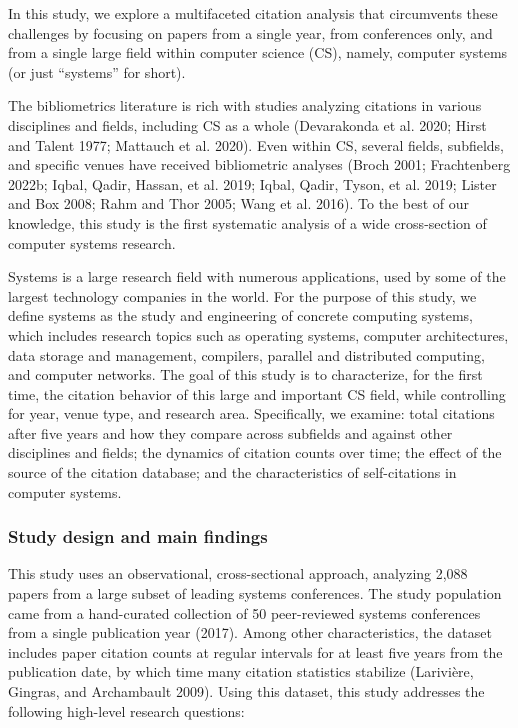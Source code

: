 \documentclass{article}
\begin{document}
In this study, we explore a multifaceted citation analysis that circumvents these challenges by focusing on papers from a single year, from conferences only, and from a single large field within computer science (CS), namely, computer systems (or just ``systems'' for short).

The bibliometrics literature is rich with studies analyzing citations in various disciplines and fields, including CS as a whole (Devarakonda et al. 2020; Hirst and Talent 1977; Mattauch et al. 2020).
Even within CS, several fields, subfields, and specific venues have received bibliometric analyses (Broch 2001; Frachtenberg 2022b; Iqbal, Qadir, Hassan, et al. 2019; Iqbal, Qadir, Tyson, et al. 2019; Lister and Box 2008; Rahm and Thor 2005; Wang et al. 2016).
To the best of our knowledge, this study is the first systematic analysis of a wide cross-section of computer systems research.

Systems is a large research field with numerous applications, used by some of the largest technology companies in the world.
For the purpose of this study, we define systems as the study and engineering of concrete computing systems, which includes research topics such as operating systems, computer architectures, data storage and management, compilers, parallel and distributed computing, and computer networks.
The goal of this study is to characterize, for the first time, the citation behavior of this large and important CS field, while controlling for year, venue type, and research area.
Specifically, we examine: total citations after five years and how they compare across subfields and against other disciplines and fields; the dynamics of citation counts over time; the effect of the source of the citation database; and the characteristics of self-citations in computer systems.

\hypertarget{study-design-and-main-findings}{%
\subsubsection*{Study design and main findings}\label{study-design-and-main-findings}}

This study uses an observational, cross-sectional approach, analyzing 2,088 papers from a large subset of leading systems conferences.
The study population came from a hand-curated collection of 50 peer-reviewed systems conferences from a single publication year (2017).
Among other characteristics, the dataset includes paper citation counts at regular intervals for at least five years from the publication date, by which time many citation statistics stabilize (Larivière, Gingras, and Archambault 2009).
Using this dataset, this study addresses the following high-level research questions:
\end{document}
